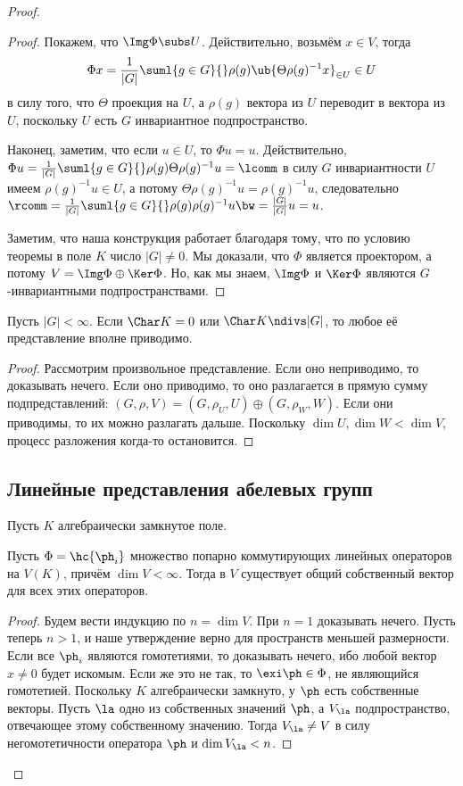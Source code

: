 \documentclass[a4paper]{article}
\newcommand{\sumlg}{\suml{g \in G}{}}
\begin{document}
\begin{proof}
\begin{proof}
Покажем, что $\Img \Phi \subs U$. Действительно, возьмём $x \in V$, тогда
$$
  \Phi x =  \frac{1}{|G|}\sumlg \rho(g)\ub{\Theta \rho(g)^{-1}x}_{\in U} \in U
$$
в силу того, что $\Theta$ проекция на $U$, а $\rho(g)$
вектора из $U$ переводит в вектора из $U$, поскольку $U$ есть $G$ инвариантное подпространство.

Наконец, заметим, что если $u \in U$, то $\Phi u = u$. Действительно, $\Phi u =  \frac{1}{|G|}\sumlg
\rho(g)\Theta \rho(g)^{-1} u = \lcomm$ в силу $G$ инвариантности $U$ имеем $\rho(g)^{-1}u \in U$, а потому
$\Theta \rho(g)^{-1}u = \rho(g)^{-1}u$, следовательно $\rcomm = \frac{1}{|G|}\sumlg \rho(g) \rho(g)^{-1}u \bw=
\frac{|G|}{|G|}u=u$.

Заметим, что наша конструкция работает благодаря тому, что по условию теоремы в  поле $K$ число $|G| \neq 0$.
Мы доказали, что $\Phi$ является проектором, а потому $V = \Img \Phi \oplus \Ker \Phi$. Но, как мы знаем,
$\Img \Phi$ и $\Ker \Phi$ являются $G$-инвариантными подпространствами.
\end{proof}

\begin{theorem}[Машке]
Пусть $|G|<\infty$. Если $\Char K = 0$ или $\Char K \ndivs |G|$, то любое её  представление вполне приводимо.
\end{theorem}
\begin{proof}
Рассмотрим произвольное представление. Если оно неприводимо, то доказывать  нечего. Если оно приводимо, то
оно разлагается в прямую сумму подпредставлений: $(G, \rho, V) = (G, \rho_U, U) \oplus (G, \rho_W, W)$. Если
они приводимы, то их можно разлагать дальше. Поскольку $\dim U, \dim W < \dim V$, процесс разложения когда-то
остановится.
\end{proof}

\subsection{Линейные представления абелевых групп}
Пусть $K$ алгебраически замкнутое поле.

\begin{theorem}
Пусть $\Phi = \hc{\ph_i}$ множество попарно коммутирующих линейных операторов  на $V(K)$, причём $\dim V <
\infty$. Тогда в $V$ существует общий собственный вектор для всех этих операторов.
\end{theorem}
\begin{proof}
Будем вести индукцию по $n = \dim V$. При $n=1$ доказывать нечего. Пусть теперь  $n > 1$, и наше утверждение
верно для пространств меньшей размерности. Если все $\ph_i$ являются гомотетиями, то доказывать нечего, ибо
любой вектор $x \neq 0$ будет искомым. Если же это не так, то $\exi \ph \in \Phi$, не являющийся гомотетией.
Поскольку $K$ алгебраически замкнуто, у $\ph$ есть собственные векторы. Пусть $\la$ одно из собственных
значений $\ph$, а $V_\la$ подпространство, отвечающее этому собственному значению. Тогда $V_\la \neq V$ в
силу негомотетичности оператора $\ph$ и $\dim V_\la < n$.


\end{proof}
\end{proof}
\end{document}
